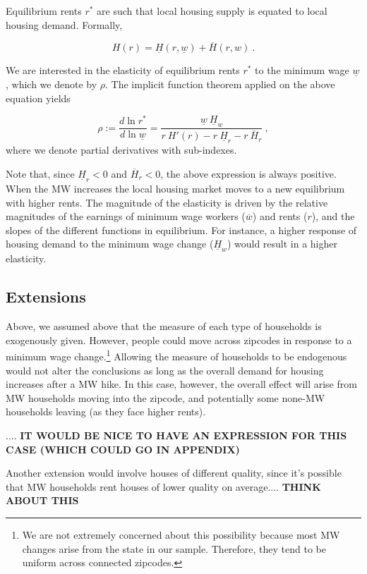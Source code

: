 Equilibrium rents $r^*$ are such that local housing supply is equated to local housing demand. 
Formally,

\begin{equation*}\label{eq:model-eq}
	H(r) =  \underline{H}(r, \underline{w}) + \overline{H}(r, w) \ .
\end{equation*}

We are interested in the elasticity of equilibrium rents $r^*$ to the minimum wage $\underline{w}$, 
which we denote by $\rho$. The implicit function theorem applied on the above equation yields

\begin{equation}\label{eq:model-elasticity}
	\rho := \frac{d \ln r^*}{d \ln \underline{w}} 
		  = \frac{\underline{w} \ \underline{H}_w}
		  		 {r\  H'(r) - r \ \underline{H}_r - r \ \overline{H}_r} \ ,
\end{equation}
where we denote partial derivatives with sub-indexes.

Note that, since $\underline{H}_r < 0$ and $\overline{H}_r < 0$, the above expression is always 
positive. When the MW increases the local housing market moves to a new equilibrium with higher 
rents. The magnitude of the elasticity is driven by the relative magnitudes of the earnings of 
minimum wage workers ($\overline{w}$) and rents ($r$), and the slopes of the different 
functions in equilibrium. For instance, a higher response of housing demand to the minimum wage 
change ($\underline{H}_w$) would result in a higher elasticity.


\subsection{Extensions}

Above, we assumed above that the measure of each type of households is exogenously given. However, 
people could move across zipcodes in response to a minimum wage change.\footnote{We are not 
	extremely concerned about this possibility because most MW changes arise from the state in our 
	sample. Therefore, they tend to be uniform across connected zipcodes.} 
Allowing the measure of households to be endogenous would not alter the conclusions as long as 
the overall demand for housing increases after a MW hike. In this case, however, the overall 
effect will arise from MW households moving into the zipcode, and potentially some none-MW 
households leaving (as they face higher rents). 

.... \textbf{IT WOULD BE NICE TO HAVE AN EXPRESSION FOR THIS CASE (WHICH COULD GO IN APPENDIX)}

Another extension would involve houses of different quality, since it's possible that MW households 
rent houses of lower quality on average.... \textbf{THINK ABOUT THIS}

